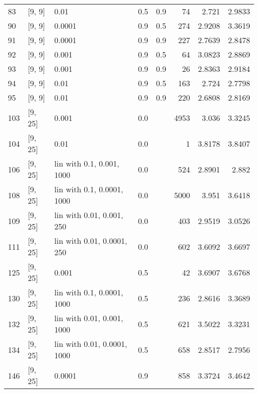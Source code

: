 \begin{longtable}{lllrrrrr}
   83 &             [9, 9] &                        0.01 &      0.5 & 0.9 &   74 &    2.721 &   2.9833 \\
   90 &             [9, 9] &                      0.0001 &      0.9 & 0.5 &  274 &   2.9208 &   3.3619 \\
   91 &             [9, 9] &                      0.0001 &      0.9 & 0.9 &  227 &   2.7639 &   2.8478 \\
   92 &             [9, 9] &                       0.001 &      0.9 & 0.5 &   64 &   3.0823 &   2.8869 \\
   93 &             [9, 9] &                       0.001 &      0.9 & 0.9 &   26 &   2.8363 &   2.9184 \\
   94 &             [9, 9] &                        0.01 &      0.9 & 0.5 &  163 &    2.724 &   2.7798 \\
   95 &             [9, 9] &                        0.01 &      0.9 & 0.9 &  220 &   2.6808 &   2.8169 \\
  103 &            [9, 25] &                       0.001 &      0.0 &     & 4953 &    3.036 &   3.3245 \\
  104 &            [9, 25] &                        0.01 &      0.0 &     &    1 &   3.8178 &   3.8407 \\
  106 &            [9, 25] &   lin with 0.1, 0.001, 1000 &      0.0 &     &  524 &   2.8901 &    2.882 \\
  108 &            [9, 25] &  lin with 0.1, 0.0001, 1000 &      0.0 &     & 5000 &    3.951 &   3.6418 \\
  109 &            [9, 25] &   lin with 0.01, 0.001, 250 &      0.0 &     &  403 &   2.9519 &   3.0526 \\
  111 &            [9, 25] &  lin with 0.01, 0.0001, 250 &      0.0 &     &  602 &   3.6092 &   3.6697 \\
  125 &            [9, 25] &                       0.001 &      0.5 &     &   42 &   3.6907 &   3.6768 \\
  130 &            [9, 25] &  lin with 0.1, 0.0001, 1000 &      0.5 &     &  236 &   2.8616 &   3.3689 \\
  132 &            [9, 25] &  lin with 0.01, 0.001, 1000 &      0.5 &     &  621 &   3.5022 &   3.3231 \\
  134 &            [9, 25] & lin with 0.01, 0.0001, 1000 &      0.5 &     &  658 &   2.8517 &   2.7956 \\
  146 &            [9, 25] &                      0.0001 &      0.9 &     &  858 &   3.3724 &   3.4642 \\

\end{longtable}
